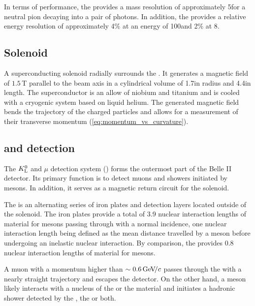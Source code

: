 In terms of performance, the \ECL provides a mass resolution of approximately 5\mevcc for a neutral pion decaying into a pair of photons.
In addition, the \ECL provides a relative energy resolution of approximately 4\% at an energy of 100\mev and 2\% at 8\gev \cite{Kou2020, Miyabayashi:2020xzp}.
\subsection{Solenoid} \label{sec:solenoid}

A superconducting solenoid radially surrounds the \ECL.
It generates a magnetic field of $1.5\,$T parallel to the beam axis in a cylindrical volume of 1.7\m in radius and 4.4\m in length.
The superconductor is an allow of niobium and titanium and is cooled with a cryogenic system based on liquid helium.
The generated magnetic field bends the trajectory of the charged particles and allows for a measurement of their transverse momentum (\cref{eq:momentum_vs_curvature}).

\subsection[$\KL$ and $\mu$ detection]{\boldmath{$\KL$} and \boldmath{$\mu$} detection}

The $\KL$ and $\mu$ detection system (\KLM) forms the outermost part of the Belle II detector.
Its primary function is to detect muons and showers initiated by \KL mesons.
In addition, it serves as a magnetic return circuit for the solenoid.

The \KLM is an alternating series of iron plates and detection layers located outside of the solenoid.
The iron plates provide a total of 3.9 nuclear interaction lengths of material for \KL mesons passing through with a normal incidence, one nuclear interaction length being defined as the mean distance travelled by a \KL meson before undergoing an inelastic nuclear interaction.
By comparison, the \ECL provides 0.8 nuclear interaction lengths of material for \KL mesons.

A muon with a momentum higher than $\sim0.6{\mathrm{\,Ge\kern -0.1em V\!/}c}$ passes through the \KLM with a nearly straight trajectory and escapes the detector.
On the other hand, a \KL meson likely interacts with a nucleus of the \ECL or the \KLM material and initiates a hadronic shower detected by the \ECL, the \KLM or both.

